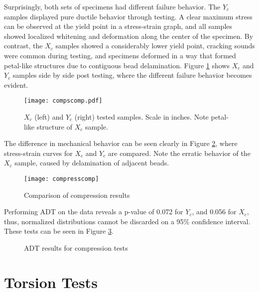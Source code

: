 \documentclass[main.tex]{subfiles}
\begin{document}
Surprisingly, both sets of specimens had different failure behavior. The $Y_c$ samples displayed pure ductile behavior through testing. A clear maximum stress can be observed at the yield point in a stress-strain graph, and all samples showed localized whitening and deformation along the center of the specimen. By contrast, the $X_c$ samples showed a considerably lower yield point, cracking sounds were common during testing, and specimens deformed in a way that formed petal-like structures due to contiguous bead delamination. Figure \ref{fig:CompSComp} shows $X_c$ and $Y_c$ samples side by side post testing, where the different failure behavior becomes evident.

\begin{figure}[!htbp]
	\center
	\texttt{[image: compscomp.pdf]}
	\captionsetup{justification=centering} %
	\caption[$X_c$ and $Y_c$ tested samples]{$X_c$ (left) and $Y_c$ (right) tested samples. Scale in inches. Note petal-like structure of $X_c$ sample.} \label{fig:CompSComp}
\end{figure}

The difference in mechanical behavior can be seen clearly in Figure \ref{fig:comprComp}, where stress-strain curves for $X_c$ and $Y_c$ are compared. Note the erratic behavior of the $X_c$ sample, caused by delamination of adjacent beads.  

\begin{figure}[!htbp]
	\center
	\texttt{[image: compresscomp]}
	\caption{Comparison of compression results} \label{fig:comprComp}
\end{figure}  

Performing ADT on the data reveals a p-value of 0.072 for $Y_c$, and 0.056 for $X_c$, thus, normalized distributions cannot be discarded on a 95\% confidence interval. These tests can be seen in Figure \ref{fig:adtcomp}.

\begin{figure}[!htbp]
	\center
	\hfill
	\caption{ADT results for compression tests} \label{fig:adtcomp}
\end{figure}

\newpage
\section{Torsion Tests} \label{sec:torsr}
\end{document}
